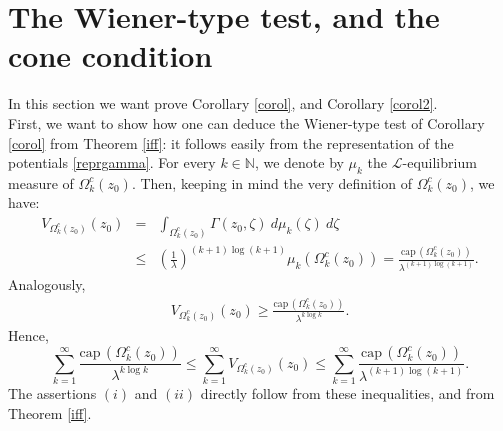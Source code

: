 \documentclass[10pt]{amsart}
\def \N {\mathbb{N}}
\def \l {\lambda}
\def\elle{\mathcal{L}}
\numberwithin{equation}{section}
\begin{document}
\section{The Wiener-type test, and the cone condition}\label{proofw}

In this section we want prove Corollary \ref{corol}, and Corollary \ref{corol2}.\\
First, we want to show how one can deduce the Wiener-type test of Corollary \ref{corol} from Theorem \ref{iff}: it follows easily from the representation of the potentials \eqref{reprgamma}.
 For every $k\in \N$, we denote by $\mu_k$ the $\elle$-equilibrium measure of 
$\Omega^c_k(z_0).$ Then, keeping in mind the very definition of $\Omega^c_k(z_0)$, we have:
\begin{eqnarray*} V_{\Omega^c_k(z_0)}(z_0) &=& \int_{\Omega^c_k(z_0)} \Gamma(z_0,\zeta)\ d\mu_k(\zeta)\ d\zeta \\
&\le&  {\left(\frac{1}{\lambda}\right)^{(k+1) \log{(k+1)}}} \mu_k (\Omega^c_k(z_0))= {\frac{\mathrm{cap\, }(\Omega^c_k(z_0))}{\l^{(k+1)\log{(k+1)}}}}.
\end{eqnarray*}
Analogously,
\begin{eqnarray*} V_{\Omega^c_k(z_0)}(z_0) \geq {\frac{\mathrm{cap\, } (\Omega^c_k(z_0))}{\l^{k\log{k}}}}.
\end{eqnarray*}
Hence,
\begin{equation*} \sum_{k=1}^{\infty}{\frac{\mathrm{cap\, } (\Omega^c_k(z_0))}{\l^{k\log{k}}}} \le   \sum_{k=1}^{\infty} V_{\Omega^c_k(z_0)}(z_0) \le 
 \sum_{k=1}^{\infty}{\frac{\mathrm{cap\, } (\Omega^c_k(z_0))}{\l^{(k+1) \log{(k+1)}}}}.
 \end{equation*} 
The assertions $(i)$ and $(ii)$ directly follow from these inequalities, and from Theorem \ref{iff}.
\endproof 
\end{document}
